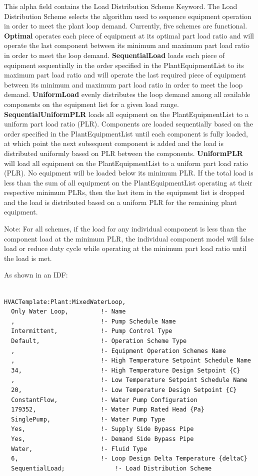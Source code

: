 This alpha field contains the Load Distribution Scheme Keyword. The Load Distribution Scheme selects the algorithm used to sequence equipment operation in order to meet the plant loop demand. Currently, five schemes are functional. \textbf{Optimal} operates each piece of equipment at its optimal part load ratio and will operate the last component between its minimum and maximum part load ratio in order to meet the loop demand. \textbf{SequentialLoad} loads each piece of equipment sequentially in the order specified in the PlantEquipmentList to its maximum part load ratio and will operate the last required piece of equipment between its minimum and maximum part load ratio in order to meet the loop demand. \textbf{UniformLoad} evenly distributes the loop demand among all available components on the equipment list for a given load range. \textbf{SequentialUniformPLR} loads all equipment on the PlantEquipmentList to a uniform part load ratio (PLR). Components are loaded sequentially based on the order specified in the PlantEquipmentList until each component is fully loaded, at which point the next subsequent component is added and the load is distributed uniformly based on PLR between the components. \textbf{UniformPLR} will load all equipment on the PlantEquipmentList to a uniform part load ratio (PLR). No equipment will be loaded below its minimum PLR. If the total load is less than the sum of all equipment on the PlantEquipmentList operating at their respective minimum PLRs, then the last item in the equipment list is dropped and the load is distributed based on a uniform PLR for the remaining plant equipment.

Note: For all schemes, if the load for any individual component is less than the component load at the minimum PLR, the individual component model will false load or reduce duty cycle while operating at the minimum part load ratio until the load is met.

As shown in an IDF:

\begin{lstlisting}

HVACTemplate:Plant:MixedWaterLoop,
  Only Water Loop,         !- Name
  ,                        !- Pump Schedule Name
  Intermittent,            !- Pump Control Type
  Default,                 !- Operation Scheme Type
  ,                        !- Equipment Operation Schemes Name
  ,                        !- High Temperature Setpoint Schedule Name
  34,                      !- High Temperature Design Setpoint {C}
  ,                        !- Low Temperature Setpoint Schedule Name
  20,                      !- Low Temperature Design Setpoint {C}
  ConstantFlow,            !- Water Pump Configuration
  179352,                  !- Water Pump Rated Head {Pa}
  SinglePump,              !- Water Pump Type
  Yes,                     !- Supply Side Bypass Pipe
  Yes,                     !- Demand Side Bypass Pipe
  Water,                   !- Fluid Type
  6,                       !- Loop Design Delta Temperature {deltaC}
  SequentialLoad;              !- Load Distribution Scheme
\end{lstlisting}
